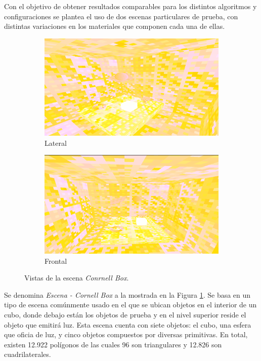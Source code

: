Con el objetivo de obtener resultados comparables para los distintos algoritmos y configuraciones se plantea el uso de dos escenas particulares de prueba, con distintas variaciones en los materiales que componen cada una de ellas.


\begin{figure}[htbp]
	\centering
	\begin{subfigure}{0.45\textwidth}
		\includegraphics[width=1\linewidth]{assets/cornell}
		\caption{Lateral}
	\end{subfigure}
	\begin{subfigure}{0.45\textwidth}
		\includegraphics[width=1\linewidth]{assets/cornell2}
		\caption{Frontal}
	\end{subfigure}
	\caption{Vistas de la escena \textit{Conrnell Box}.}
	\label{img:cornell}
\end{figure}

Se denomina \textit{Escena - Cornell Box} a la mostrada en la Figura \ref{img:cornell}. Se basa en un tipo de escena comúnmente usado en el que se ubican objetos en el interior de un cubo, donde debajo están los objetos de prueba y en el nivel superior reside el objeto que emitirá luz. Esta escena cuenta con siete objetos: el cubo, una esfera que oficia de luz, y cinco objetos compuestos por diversas primitivas. En total, existen 12.922 polígonos de las cuales 96 son triangulares y 12.826 son cuadrilaterales.


